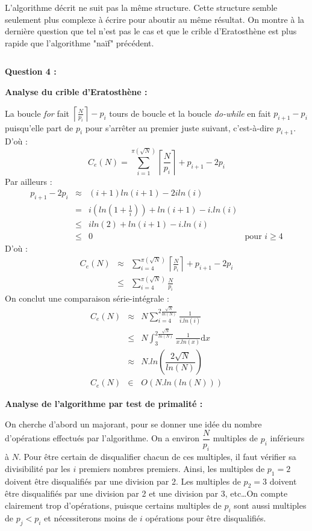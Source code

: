 \documentclass[../main.tex]{subfiles}
\begin{document}
L'algorithme décrit ne suit pas la même structure. Cette structure semble seulement plus complexe à écrire pour aboutir au même résultat. On montre à la dernière question que tel n'est pas le cas et que le crible d'Eratosthène est plus rapide que l'algorithme "naïf" précédent.
\inputminted{c}{solutions/part2/chapter2/eratosthene.c}
\textbf{Question 4 :}

\textbf{Analyse du crible d'Eratosthène :}

La boucle \textit{for} fait $\left\lceil\frac{N}{p_i}\right\rceil - p_i$ tours de boucle et la boucle \textit{do-while} en fait $p_{i+1} - p_i$ puisqu'elle part de $p_i$ pour s'arrêter au premier juste suivant, c'est-à-dire $p_{i+1}$.\newline
D'où :
$$C_{e}(N) = \displaystyle\sum_{i = 1}^{\pi(\sqrt{N})}\left\lceil\frac{N}{p_i}\right\rceil + p_{i+1} - 2p_i$$
Par ailleurs :
$$\begin{array}{lcll}
p_{i+1} - 2p_i & \approx & (i+1)ln(i+1) - 2iln(i) \\
 & = &i(ln(1 + \frac{1}{i})) + ln(i+1) - i.ln(i)\\
 &\leq & iln(2) + ln(i+1)-i.ln(i) \\
 &\leq &0 &\text{pour $i \geq 4$}
\end{array}$$ 
D'où :
$$\begin{array}{lcl}
C_{e}(N) & \approx & \displaystyle\sum_{i = 4}^{\pi(\sqrt{N})} \left\lceil\frac{N}{p_i}\right\rceil + p_{i+1} - 2p_i \\
&\leq & \displaystyle\sum_{i = 4}^{\pi(\sqrt{N})} \frac{N}{p_i}
\end{array}
$$
On conclut une comparaison série-intégrale :
$$\begin{array}{lcl}
C_{e}(N) & \approx & N\displaystyle\sum_{i=4}^{2\frac{\sqrt{N}}{ln(N)}}\frac{1}{i.ln(i)} \\
& \leq & N\displaystyle\int_3^{2\frac{\sqrt{N}}{ln(N)}}\frac{1}{x.ln(x)}\mathrm{d}x \\
& \approx & N.ln\left(\dfrac{2\sqrt{N}}{ln(N)}\right) \\
C_{e}(N) & \in & O(N.ln(ln(N)))
\end{array}
$$

\textbf{Analyse de l'algorithme par test de primalité :}

On cherche d'abord un majorant, pour se donner une idée du nombre d'opérations effectués par l'algorithme. On a environ $\dfrac{N}{p_i}$ multiples de $p_i$ inférieurs à $N$. Pour être certain de disqualifier chacun de ces multiples, il faut vérifier sa divisibilité par les $i$ premiers nombres premiers. Ainsi, les multiples de $p_1 = 2$ doivent être disqualifiés par une division par 2. Les multiples de $p_2 = 3$ doivent être disqualifiés par une division par 2 et une division par 3, etc\dots On compte clairement trop d'opérations, puisque certains multiples de $p_i$ sont aussi multiples de $p_j < p_i$ et nécessiterons moins de $i$ opérations pour être disqualifiés.
\end{document}
